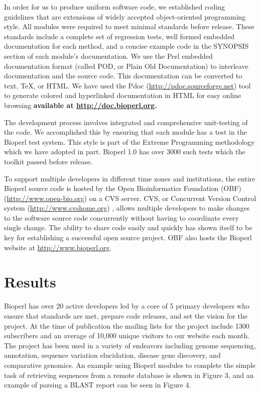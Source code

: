 \documentclass[12pt]{article}
\begin{document}
In order for us to produce uniform software code, we established
coding guidelines that are extensions of widely accepted
object-oriented programming style.  All modules were required to meet
minimal standards before release.  These standards include a complete
set of regression tests, well formed embedded documentation for each
method, and a concise example code in the SYNOPSIS section of each
module's documentation.  We use the Perl embedded documentation format
(called POD, or Plain Old Documentation) to interleave documentation and
the source code.  This documentation can be converted to text, TeX, or
HTML.  We have used the Pdoc (\url{http://pdoc.sourceforge.net}) tool to
generate colored and hyperlinked documentation in HTML for easy
online browsing \textbf{ available at \url{http://doc.bioperl.org}.}

The development process involves integrated and comprehensive
unit-testing of the code.  We accomplished this by ensuring that each
module has a test in the Bioperl test system.  This style is part of
the Extreme Programming methodology \cite{xprogramming} which we have
adopted in part.  Bioperl 1.0 has over 3000 such tests which the toolkit
passed before release.

To support multiple developers in different time zones and
institutions, the entire Bioperl source code is hosted by the Open
Bioinformatics Foundation (OBF) (\url{http://www.open-bio.org}) on a
CVS server.  CVS, or Concurrent Version Control system
(\url{http://www.cvshome.org}) \cite{cvsbook}, allows multiple
developers to make changes to the software source code concurrently
without having to coordinate every single change.  The ability to
share code easily and quickly has shown itself to be key for
establishing a successful open source project.  OBF also hosts the
Bioperl website at \url{http://www.bioperl.org}.

\section{Results}

Bioperl has over 20 active developers led by a core of 5 primary developers
who ensure that standards are met, prepare code releases, and set the
vision for the project.  At the time of publication the mailing lists
for the project include 1300 subscribers and an average of 10,000
unique visitors to our website each month.  The project has been used
in a variety of endeavors including genome sequencing, annotation,
sequence variation elucidation, disease gene discovery, and
comparative genomics.  An example using Bioperl modules to complete
the simple task of retrieving sequences from a remote database is
shown in Figure 3, and an example of parsing a BLAST report can be
seen in Figure 4.
\end{document}
